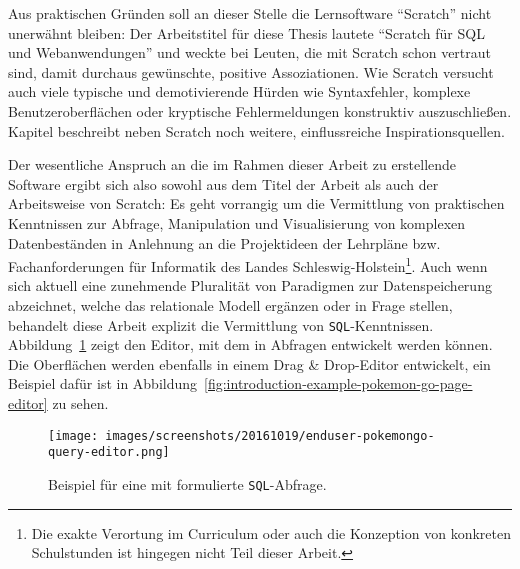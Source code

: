 
Aus praktischen Gründen soll an dieser Stelle die Lernsoftware "`Scratch"' nicht unerwähnt bleiben: Der Arbeitstitel für diese Thesis lautete "`Scratch für SQL und Webanwendungen"' und weckte bei Leuten, die mit Scratch schon vertraut sind, damit durchaus gewünschte, positive Assoziationen. Wie Scratch versucht auch \idename{} viele typische und demotivierende Hürden wie Syntaxfehler, komplexe Benutzeroberflächen oder kryptische Fehlermeldungen konstruktiv auszuschließen. Kapitel  beschreibt neben Scratch noch weitere, einflussreiche Inspirationsquellen.

Der wesentliche Anspruch an die im Rahmen dieser Arbeit zu erstellende Software ergibt sich also sowohl aus dem Titel der Arbeit als auch der Arbeitsweise von Scratch: Es geht vorrangig um die Vermittlung von praktischen Kenntnissen zur Abfrage, Manipulation und Visualisierung von komplexen Datenbeständen in Anlehnung an die Projektideen der Lehrpläne \cite{lehrplan-inf-sek-1} bzw. Fachanforderungen \cite{lehrplan-inf-sek-2} für Informatik des Landes Schleswig-Holstein\footnote{Die exakte Verortung im Curriculum oder auch die Konzeption von konkreten Schulstunden ist hingegen nicht Teil dieser Arbeit.}. Auch wenn sich aktuell eine zunehmende Pluralität von Paradigmen zur Datenspeicherung abzeichnet, welche das relationale Modell ergänzen oder in Frage stellen, behandelt diese Arbeit explizit die Vermittlung von \texttt{SQL}-Kenntnissen. Abbildung~\ref{fig:introduction-example-pokemon-go-query-editor} zeigt den Editor, mit dem in \idename{} Abfragen entwickelt werden können. Die Oberflächen werden ebenfalls in einem Drag \& Drop-Editor entwickelt, ein Beispiel dafür ist in Abbildung~\ref{fig:introduction-example-pokemon-go-page-editor} zu sehen.

\begin{figure}[h]
  \texttt{[image: images/screenshots/20161019/enduser-pokemongo-query-editor.png]}
  \caption{Beispiel für eine mit \idename{} formulierte \texttt{SQL}-Abfrage.}
  \label{fig:introduction-example-pokemon-go-query-editor}
\end{figure}


